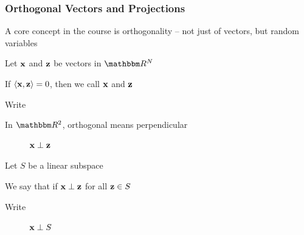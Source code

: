 \begin{frame}\frametitle{Orthogonal Vectors and Projections}
    
    \vspace{2em}
    A core concept in the course is orthogonality -- not just of vectors,
     but random variables 
    
    \vspace{.7em}
    Let ${\mathbf x}$ and ${\mathbf z}$ be vectors in $\RR^N$
    
    If $\left\langle{ {\mathbf x} ,   {\mathbf z} }\right\rangle = 0$,
    then we  call ${\mathbf x}$ and ${\mathbf z}$
    
    Write \navy{$\boldx \perp \boldz$}
    
    In $\RR^2$, orthogonal means perpendicular 
    
\end{frame}

\begin{frame}

    \begin{figure}
       \begin{center}
        
        \caption{\label{f:xpz} $\boldx \perp \boldz$}
       \end{center}
    \end{figure}

\end{frame}

\begin{frame}

     \vspace{2em}
    Let $S$ be a linear subspace
    
    \vspace{.7em}
    We say that 
     if $\boldx \perp \boldz$ for all 
    ${\mathbf z} \in S$

    Write 
    
\end{frame}


\begin{frame}
    
    \begin{figure}
       \begin{center}
        
        \caption{\label{f:xpS} ${\mathbf x} \perp S$}
       \end{center}
    \end{figure}

\end{frame}

